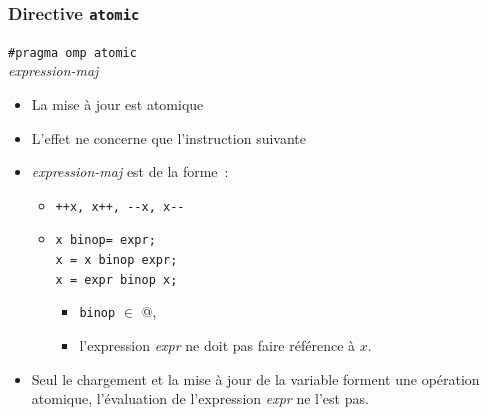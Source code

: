 \documentclass{beamer}
\begin{document}
\begin{frame}[fragile]
  \frametitle{Directive {\tt atomic}} 
  
      \begin{framed}
        {\tt \#pragma omp atomic}\\
        {\it expression-maj}
      \end{framed}

\medskip

\begin{itemize}
  \item La mise à jour est \alert{atomique}
  \item L'effet ne concerne que l'instruction suivante
  \item {\it expression-maj} est de la forme~:
    \begin{itemize}
    \item {\tt ++x, x++, {-}{-}x, x{-}{-}}
    \item {\tt x~binop= expr;}\\
      {\tt x = x binop expr;}\\
      {\tt x = expr binop x;}\\
      \begin{itemize}
        \item \texttt{binop} $\in$ \verb@ {+, *, -, /, &, &&, ^, |, ||, >>, <<}@,
        \item l'expression {\it expr} ne doit pas faire référence à $x$. 
      \end{itemize}
    \end{itemize}

  \item Seul le chargement et la mise à jour de la variable forment
    une opération atomique,
    l'évaluation de l'expression {\it expr} ne l'est pas.
  \end{itemize}


\end{frame}
\end{document}
